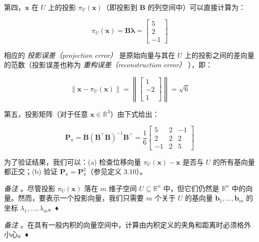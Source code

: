 \begin{notebox}
第四，$ \boldsymbol{x} $ 在 $ U $ 上的投影 $ \pi_U(\boldsymbol{x}) $（即投影到 $ \boldsymbol{B} $ 的列空间中）可以直接计算为：

\begin{equation}
\pi_U(\boldsymbol{x}) = \boldsymbol{B} \boldsymbol{\lambda} = \begin{bmatrix} 5 \\ 2 \\ -1 \end{bmatrix}
\tag{3.62}\label{eq:3-62}
\end{equation}

相应的 \emph{投影误差（projection error）} 是原始向量与其在 $ U $ 上的投影之间的差向量的范数（投影误差也称为 \emph{重构误差（reconstruction error）} ），即：

\begin{equation}
\|\boldsymbol{x} - \pi_U(\boldsymbol{x})\| = \left\| \begin{bmatrix} 1 \\ -2 \\ 1 \end{bmatrix} \right\| = \sqrt{6}
\tag{3.63}\label{eq:3-63}
\end{equation}

第五，投影矩阵（对于任意 $ \boldsymbol{x} \in \mathbb{R}^3 $）由下式给出：

\begin{equation}
\boldsymbol{P}_\pi = \boldsymbol{B} (\boldsymbol{B}^\top \boldsymbol{B})^{-1} \boldsymbol{B}^\top = \frac{1}{6} \begin{bmatrix} 5 & 2 & -1 \\ 2 & 2 & 2 \\ -1 & 2 & 5 \end{bmatrix}
\tag{3.64}\label{eq:3-64}
\end{equation}

为了验证结果，我们可以：(a) 检查位移向量 $ \pi_U(\boldsymbol{x}) - \boldsymbol{x} $ 是否与 $ U $ 的所有基向量都正交；(b) 验证 $ \boldsymbol{P}_\pi = \boldsymbol{P}_\pi^2 $（参见定义 3.10）。
\end{notebox}

\emph{备注} 。尽管投影 $ \pi_U(\boldsymbol{x}) $ 落在 $ m $ 维子空间 $ U \subseteq \mathbb{R}^n $ 中，但它们仍然是 $ \mathbb{R}^n $ 中的向量。然而，要表示一个投影向量，我们只需要 $ m $ 个关于 $ U $ 的基向量 $ \boldsymbol{b}_1, \ldots, \boldsymbol{b}_m $ 的坐标 $ \lambda_1, \ldots, \lambda_m $。♦

\emph{备注} 。在具有一般内积的向量空间中，计算由内积定义的夹角和距离时必须格外小心。♦

